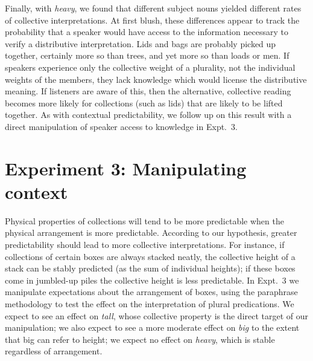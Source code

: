 \documentclass[linguex]{sp}
\begin{document}
Finally, with \emph{heavy}, we found that different subject nouns yielded different rates of collective interpretations. At first blush, these differences appear to track the probability that a speaker would have access to the information necessary to verify a distributive interpretation. Lids and bags are probably picked up together, certainly more so than trees, and yet more so than loads or men. 
If speakers experience only the collective weight of a plurality, not the individual weights of the members, they lack knowledge which would license the distributive meaning. 
If listeners are aware of this, then the alternative, collective reading becomes more likely for collections (such as lids) that are likely to be lifted together.
As with contextual predictability, we follow up on this result with a direct manipulation of speaker access to knowledge in Expt.~3.


\section{Experiment 3: Manipulating context}


Physical properties of collections will tend to be more predictable when the physical arrangement is more predictable. 
According to our hypothesis, greater predictability should lead to more collective interpretations.
For instance, if collections of certain boxes are always stacked neatly, the collective height of a stack can be stably predicted (as the sum of individual heights); if these boxes come in jumbled-up piles the collective height is less predictable.
In Expt.~3 we manipulate expectations about the arrangement of boxes, using the paraphrase methodology to test the effect on the interpretation of plural predications. We expect to see an effect on \emph{tall}, whose collective property is the direct target of our manipulation; we also expect to see a more moderate effect on \emph{big} to the extent that big can refer to height; we expect no effect on \emph{heavy}, which is stable regardless of arrangement.
\end{document}
